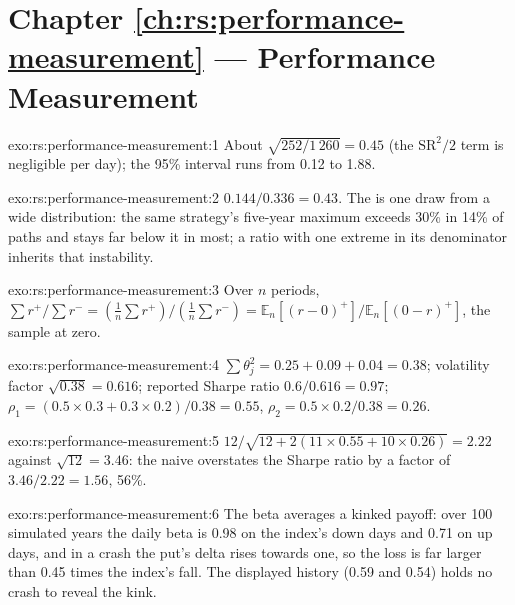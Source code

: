 \section*{Chapter \ref{ch:rs:performance-measurement} --- Performance Measurement}

\begin{solution}{exo:rs:performance-measurement:1}
About $\sqrt{252/1\,260} = 0.45$ (the $\mathrm{SR}^2/2$ term is negligible per day); the 95\% interval runs from 0.12 to 1.88.
\end{solution}

\begin{solution}{exo:rs:performance-measurement:2}
$0.144/0.336 = 0.43$. The  is one draw from a wide distribution: the same strategy's five-year maximum exceeds 30\% in 14\% of paths and stays
far below it in most; a ratio with one extreme in its denominator inherits that instability.
\end{solution}

\begin{solution}{exo:rs:performance-measurement:3}
Over $n$ periods, $\sum r^+ / \sum r^- = (\frac1n\sum r^+)/(\frac1n\sum r^-) = \mathbb{E}_n[(r - 0)^+]/\mathbb{E}_n[(0 - r)^+]$, the sample  at zero.
\end{solution}

\begin{solution}{exo:rs:performance-measurement:4}
$\sum\theta_j^2 = 0.25 + 0.09 + 0.04 = 0.38$; volatility factor $\sqrt{0.38} = 0.616$; reported Sharpe ratio $0.6/0.616 = 0.97$;
$\rho_1 = (0.5 \times 0.3 + 0.3 \times 0.2)/0.38 = 0.55$, $\rho_2 = 0.5 \times 0.2/0.38 = 0.26$.
\end{solution}

\begin{solution}{exo:rs:performance-measurement:5}
$12/\sqrt{12 + 2(11 \times 0.55 + 10 \times 0.26)} = 2.22$ against $\sqrt{12} = 3.46$: the naive  overstates the Sharpe ratio by a factor of
$3.46/2.22 = 1.56$, 56\%.
\end{solution}

\begin{solution}{exo:rs:performance-measurement:6}
The beta averages a kinked payoff: over 100 simulated years the daily beta is 0.98 on the index's down days and 0.71 on up days, and in a crash the put's delta
rises towards one, so the loss is far larger than 0.45 times the index's fall. The displayed history (0.59 and 0.54) holds no crash to reveal the kink.
\end{solution}

